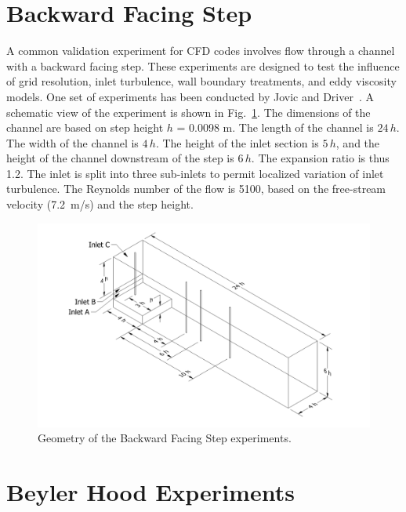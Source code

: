 \section{Backward Facing Step}

A common validation experiment for CFD codes involves flow through a channel with a backward facing step. These experiments are designed to test the influence of grid resolution, inlet turbulence, wall boundary treatments, and eddy viscosity models. One set of experiments has been conducted by Jovic and Driver~\cite{JD:1994}.  A schematic view of the experiment is shown in Fig.~\ref{tunnel_drawing}. The dimensions of the channel are based on step height $h$ = 0.0098 m.  The length of the channel is $24 \, h$. The width of the channel is $4 \, h$. The height of the inlet section is $5 \, h$, and the height of the channel downstream of the step is $6 \, h$. The expansion ratio is thus 1.2.  The inlet is split into three sub-inlets to permit localized variation of inlet turbulence.  The Reynolds number of the flow is 5100, based on the free-stream velocity (7.2~m/s) and the step height.

\begin{figure}[!ht]
\includegraphics[width=\textwidth]{FIGURES/Backward_Facing_Step/tunnel_drawing}
\caption[Geometry of the Backward Facing Step experiments]{Geometry of the Backward Facing Step experiments.}
\label{tunnel_drawing}
\end{figure}


\section{Beyler Hood Experiments}

